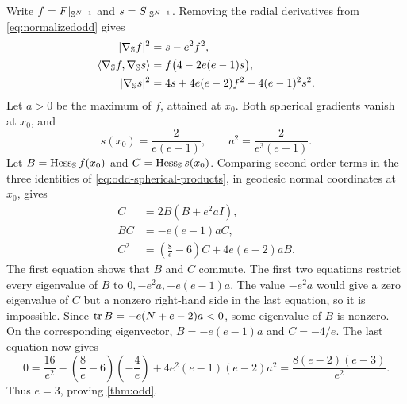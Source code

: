 Write \(f=F|_{\mathbb S^{N-1}}\) and \(s=S|_{\mathbb S^{N-1}}\).
Removing the radial derivatives from \eqref{eq:normalizedodd} gives
\begin{equation}\label{eq:odd-spherical-products}
\begin{aligned}
 |\nabla_{\mathbb S}f|^2&=s-e^2f^2,\\
 \langle\nabla_{\mathbb S}f,\nabla_{\mathbb S}s\rangle
   &=f\bigl(4-2e(e-1)s\bigr),\\
 |\nabla_{\mathbb S}s|^2&=4s+4e(e-2)f^2-4(e-1)^2s^2.
\end{aligned}
\end{equation}
Let \(a>0\) be the maximum of \(f\), attained at \(x_0\).
Both spherical gradients vanish at \(x_0\), and
\[
 s(x_0)=\frac{2}{e(e-1)},\qquad
 a^2=\frac{2}{e^3(e-1)}.
\]
Let \(B=\operatorname{Hess}_{\mathbb S}f(x_0)\) and
\(C=\operatorname{Hess}_{\mathbb S}s(x_0)\). Comparing second-order terms in
the three identities of \eqref{eq:odd-spherical-products},
in geodesic normal coordinates at \(x_0\), gives
\begin{equation}\label{eq:odd-maximum-hessians}
\begin{aligned}
 C&=2B(B+e^2aI),\\
 BC&=-e(e-1)aC,\\
 C^2&=\left(\frac8e-6\right)C+4e(e-2)aB.
\end{aligned}
\end{equation}
The first equation shows that \(B\) and \(C\) commute.
The first two equations restrict every eigenvalue of \(B\) to
\(0,-e^2a,-e(e-1)a\). The value \(-e^2a\) would give a zero
eigenvalue of \(C\) but a nonzero right-hand side in the last
equation, so it is impossible. Since
\(\operatorname{tr} B=-e(N+e-2)a<0\), some eigenvalue of \(B\) is nonzero.
On the corresponding eigenvector, \(B=-e(e-1)a\) and
\(C=-4/e\). The last equation now gives
\[
 0=\frac{16}{e^2}
   -\left(\frac8e-6\right)\left(-\frac4e\right)
   +4e^2(e-1)(e-2)a^2
   =\frac{8(e-2)(e-3)}{e^2}.
\]
Thus \(e=3\), proving \cref{thm:odd}.

